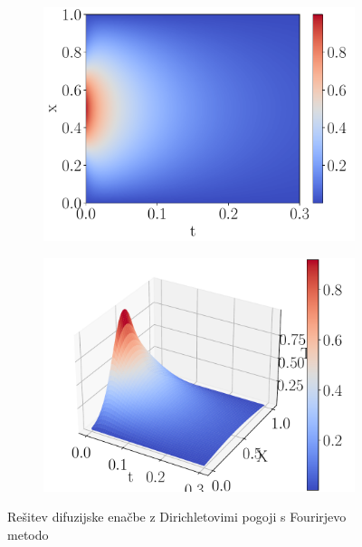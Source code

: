 \documentclass{article}
\begin{document}
\begin{figure}[H]
    \centering
    \begin{subfigure}{0.45\textwidth}
        \centering
        \includegraphics[width=\linewidth]{hom_fourier2d.pdf}
    \end{subfigure}
    \hspace{0.5cm}
    \begin{subfigure}{0.45\textwidth}
        \centering
        \includegraphics[width=\linewidth]{hom_fourier3d.pdf}
    \end{subfigure}
	\caption{Rešitev difuzijske enačbe z Dirichletovimi pogoji s Fourirjevo metodo}
\end{figure}
\end{document}
